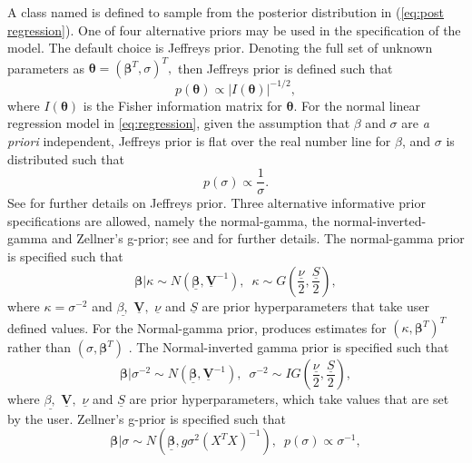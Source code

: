 \documentclass[article]{jss}
\begin{document}
A class named  is defined to sample from the
posterior distribution in (\ref{eq:post regression}). One of four
alternative priors may be used in the specification of the model.  The
default choice is Jeffreys prior. Denoting the full set of unknown
parameters as $\bm{\theta}=(\bm{\beta}^{T},\sigma)^{T},$ then Jeffreys
prior is defined such that 
\begin{equation}
  p(\bm{\theta})\propto|I(\bm{\theta})|^{-1/2},\label{eq:Jeffrey's
    Prior}
\end{equation} 
where $I(\bm{\theta})$ is the Fisher information matrix for
$\bm{\theta}.$ For the normal linear regression model in
\ref{eq:regression}, given the assumption that $\beta$ and $\sigma$
are \emph{a priori} independent, Jeffreys prior is flat over the
real number line for $\beta$, and $\sigma$ is distributed such
that
\begin{equation}
		p\left(\sigma\right)\propto\frac{1}{\sigma}.
\end{equation}
See \cite{Zellner1971} for further details on Jeffreys prior. Three
alternative informative prior specifications are allowed, namely the
normal-gamma, the normal-inverted-gamma and Zellner's g-prior; see
\cite{Zellner1971} and \cite{MarinRobert2007} for further details.
The normal-gamma prior is specified such that
\begin{equation}
  \bm{\beta}|\kappa\sim
  N(\bm{\underline{\beta}},\underline{\bm{V}}^{-1}),\,\,\,\kappa\sim
  G\left(\frac{\underline{\nu}}{2},\frac{\underline{S}}{2}\right),\label{eq:Normal
    Gamma}
\end{equation} 
where $\kappa=\sigma^{-2}$ and $\underline{\beta,}$
$\underline{\bm{V}},$ $\underline{\nu}$ and $\underline{S}$ are prior
hyperparameters that take user defined values. For the Normal-gamma
prior,  produces estimates for\emph{
  $\left(\kappa,\bm{\beta}^{T}\right)^{T}$ }rather than
$\left(\sigma,\bm{\beta}^{T}\right)$ . The Normal-inverted gamma prior
is specified such that
\begin{equation}
  \bm{\beta}|\sigma^{-2}\sim
  N(\bm{\underline{\beta}},\underline{\bm{V}}^{-1}),\,\,\,\sigma^{-2}\sim
  IG\left(\frac{\underline{\nu}}{2},\frac{\underline{S}}{2}\right),\label{eq:Normal
    Inverted Gamma}
\end{equation} 
where $\underline{\beta,}$ $\underline{\bm{V}},$ $\underline{\nu}$ and
$\underline{S}$ are prior hyperparameters, which take values that are
set by the user. Zellner's g-prior is specified such that
\begin{equation} \bm{\beta}|\sigma\sim
  N\left(\underline{\bm{\beta}},g\sigma^{2}\left(X^{T}X\right)^{-1}\right),\,\,\,
  p(\sigma)\propto\sigma^{-1},\label{eq:g-prior}
\end{equation}
\end{document}
